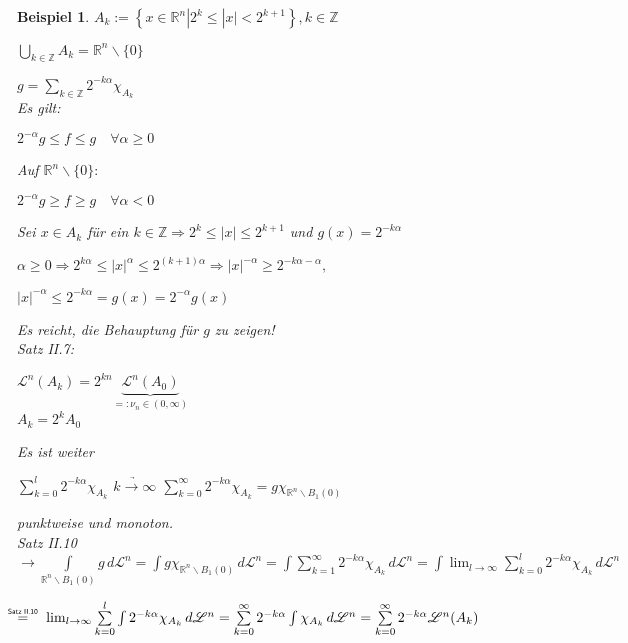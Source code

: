 \documentclass[11pt]{memoir}
\theoremstyle{changebreak}
\newtheorem{Beispiel}{Beispiel}[chapter]
\newcommand\overequal[1]{\mathrel{\overset{\makebox[0pt]{\mbox{\normalfont\tiny\sffamily $ #1 $}}}{=}}}
\begin{document}
\begin{Beispiel}
$A_k := \left\{x \in \mathbb R^n | 2^k \leq |x| < 2^{k+1}\right\}, k \in \mathbb Z$ 
\par\bigskip
$\bigcup\limits_{k \in \mathbb Z} A_k = \mathbb R^n\backslash\{0\}$ 
\par\bigskip
$g = \sum\limits_{k \in \mathbb Z} 2^{-k\alpha}\chi_{A_k}$ \\
Es gilt: 
\begin{center}
	$2^{-\alpha}g \leq f \leq g\quad \forall \alpha \geq 0$ 
\end{center}
Auf $\mathbb R^n\backslash\{0\}: $
\begin{center}
	$2^{-\alpha}g \geq f\geq g\quad \forall \alpha < 0$ 
\end{center}
Sei $x \in A_k$ für ein $k \in \mathbb Z \Rightarrow 2^k \leq |x| \leq 2^{k+1}$ und $g(x) = 2^{-k\alpha}$ 
\par\bigskip
$\alpha \geq 0 \Rightarrow 2^{k\alpha} \leq |x|^\alpha \leq 2^{(k+1)\alpha} \Rightarrow |x|^{-\alpha} \geq 2^{-k\alpha - \alpha}, $
\par\bigskip
$|x|^{-\alpha} \leq 2^{-k\alpha} = g(x) = 2^{-\alpha} g(x)$ 
\par\bigskip
Es reicht, die Behauptung für $g$ zu zeigen! \\
Satz II.7: 
\begin{center}
	$\mathscr L^n(A_k) = 2^{kn}\underbrace{\mathscr L^n(A_0)}_{=: \nu_n \in (0, \infty)}$  \\
	$A_k = 2^k A_0$
\end{center}
Es ist weiter 
\begin{center}
	$\sum\limits_{k=0}^l 2^{-k\alpha}\chi_{A_k}$ $\underrightarrow{k \rightarrow \infty}$ $\sum\limits_{k=0}^\infty 2^{-k\alpha}\chi_{A_k} = g\chi_{\mathbb R^n \backslash B_1(0)}$
\end{center} 
punktweise und monoton. \\
Satz II.10 \\
$\rightarrow \int\limits_{\mathbb R^n\backslash B_1(0)} g \,d\mathscr L^n = \int g\chi_{\mathbb R^n\backslash B_1(0)} \,d\mathscr L^n = \int \sum\limits_{k=1}^\infty 2^{-k\alpha}\chi_{A_k} \,d\mathscr L^n = \int \lim_{l \rightarrow \infty} \sum\limits_{k=0}^l 2^{-k\alpha} \chi_{A_k} \,d\mathscr L^n$
\par\bigskip
$\overequal{\text{Satz II.10}} \quad \lim_{l \rightarrow \infty} \sum\limits_{k=0}^l \int 2^{-k\alpha}\chi_{A_k} \,d\mathscr L^n = \sum\limits_{k=0}^\infty 2^{-k\alpha} \int \chi_{A_k} \,d\mathscr L^n = \sum\limits_{k=0}^\infty 2^{-k\alpha} \mathscr L^n (A_k)$ 
\par\bigskip

\end{Beispiel}
\end{document}

